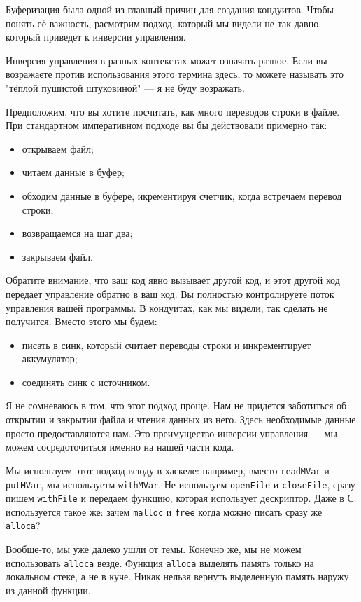 Буферизация была одной из главный причин для создания кондуитов. Чтобы понять её 
важность, расмотрим подход, который мы видели не так давно, который приведет к 
инверсии управления.
\begin{remark}
Инверсия управления в разных контекстах может означать разное. Если вы возражаете 
против использования этого термина здесь, то можете называть это 
"тёплой пушистой штуковиной" --- я не буду возражать.
\end{remark}
Предположим, что вы хотите посчитать, как много переводов строки в файле. При 
стандартном императивном подходе вы бы действовали примерно так:
\begin{itemize}  
\item   открываем файл;
\item   читаем данные в буфер;
\item   обходим данные в буфере, икрементируя счетчик, когда встречаем перевод строки;
\item   возвращаемся на шаг два;
\item   закрываем файл.
\end{itemize}
Обратите внимание, что ваш код явно вызывает другой код, и этот другой код 
передает управление обратно в ваш код. Вы полностью контролируете поток 
управления вашей программы. В кондуитах, как мы видели, так сделать 
не получится. Вместо этого мы будем:
\begin{itemize}
\item  писать в синк, который считает переводы строки и инкрементирует  аккумулятор;
\item  соединять синк с источником.
\end{itemize} 
Я не сомневаюсь в том, что этот подход проще. Нам не придется заботиться об 
открытии и закрытии файла и чтения данных из него. Здесь необходимые данные 
просто предоставляются нам. Это преимущество инверсии управления --- мы 
можем сосредоточиться именно на нашей части кода.

Мы используем этот подход всюду в хаскеле: например, вместо \lstinline'readMVar' 
и \lstinline'putMVar', мы используетм \lstinline'withMVar'. Не используем 
\lstinline'openFile' и \lstinline'closeFile', сразу пишем \lstinline'withFile' 
и передаем функцию, которая использует дескриптор. Даже в С используется такое 
же: зачем \lstinline'malloc' и \lstinline'free' когда можно писать сразу же
\lstinline'alloca'?

Вообще-то, мы уже далеко ушли от темы. Конечно же, мы не можем использовать 
\lstinline'alloca' везде. Функция \lstinline'alloca' выделять память только на 
локальном стеке, а не в куче. Никак нельзя вернуть выделенную память наружу из 
данной функции.

